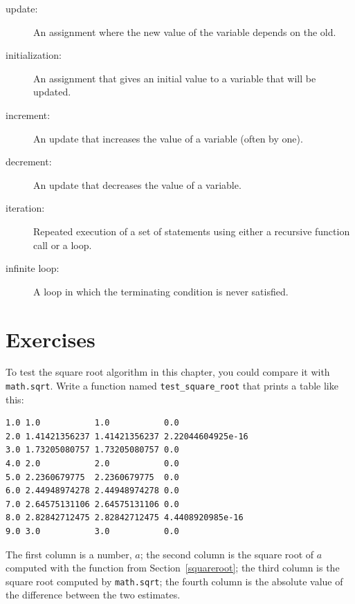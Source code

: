\documentclass[10pt]{book}
\begin{document}
\begin{CJK}{UTF8}{gbsn}
\begin{description}
\item[update:] An assignment where the new value of the variable
depends on the old.

\item[initialization:] An assignment that gives an initial value to
a variable that will be updated.

\item[increment:] An update that increases the value of a variable
(often by one).

\item[decrement:] An update that decreases the value of a variable.

\item[iteration:] Repeated execution of a set of statements using
either a recursive function call or a loop.

\item[infinite loop:] A loop in which the terminating condition is
never satisfied.

\end{description}


\section{Exercises}

\begin{exercise}

To test the square root algorithm in this chapter, you could compare
it with {\tt math.sqrt}.  Write a function named \verb"test_square_root"
that prints a table like this:

\begin{verbatim}
1.0 1.0           1.0           0.0
2.0 1.41421356237 1.41421356237 2.22044604925e-16
3.0 1.73205080757 1.73205080757 0.0
4.0 2.0           2.0           0.0
5.0 2.2360679775  2.2360679775  0.0
6.0 2.44948974278 2.44948974278 0.0
7.0 2.64575131106 2.64575131106 0.0
8.0 2.82842712475 2.82842712475 4.4408920985e-16
9.0 3.0           3.0           0.0

\end{verbatim}
%
The first column is a number, $a$; the second column is
the square root of $a$ computed with the function from
Section~\ref{squareroot}; the third column is the square root computed
by {\tt math.sqrt}; the fourth column is the absolute value
of the difference between the two estimates.
\end{exercise}



\end{CJK}
\end{document}
